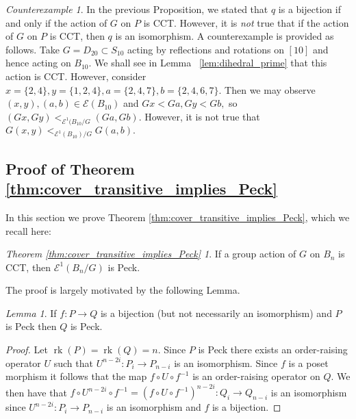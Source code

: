 \documentclass[10 pt]{amsart}
\theoremstyle{plain}
\theoremstyle{definition}
\theoremstyle{remark}
\numberwithin{equation}{section}
\newtheorem{lem}[thm]{Lemma}
\theoremstyle{remark}
\newtheorem{counterexample}[thm]{Counterexample}
\newcommand\ssec{\subsection}
\newcommand\rk{\operatorname{rk}}
\begin{document}
\begin{counterexample}
In the previous Proposition, we stated that $q$ is a bijection if and only if the action of $G$ on $P$ is CCT. However, it is {\it not} true that if the action of $G$ on $P$ is CCT, then $q$ is an isomorphism. A counterexample is provided as follows. Take $G=D_{20} \subset S_{10}$ acting by reflections and rotations on $[10]$ and hence acting on $B_{10}.$ We shall see in Lemma ~\ref{lem:dihedral_prime} that this action is CCT. However, consider $x = \{2,4\},y = \{1,2,4\},a = \{2,4,7\},b = \{2,4,6,7\}.$ Then we may observe $(x , y),(a, b) \in \mathcal E(B_{10})$ and $Gx < Ga, Gy < Gb,$ so $(Gx, Gy) <_{\mathcal E^1(B_{10}/G} (Ga, Gb).$ However, it is not true that $G(x, y)<_{\mathcal E^1(B_{10})/G} G(a,b).$
\end{counterexample}



\ssec{Proof of Theorem \ref{thm:cover_transitive_implies_Peck}}\label{ssec:proof_of_cover_transitive_implies_Peck}

In this section we prove Theorem \ref{thm:cover_transitive_implies_Peck}, which we recall here:

\newtheorem*{cover_transitive_implies_Peck}{Theorem \ref{thm:cover_transitive_implies_Peck}}
\begin{cover_transitive_implies_Peck}
If a group action of $G$ on $B_n$ is CCT, then $\mathcal E^1(B_n/G)$ is Peck.
\end{cover_transitive_implies_Peck}


The proof is largely motivated by the following Lemma.

\begin{lem}\label{lem:bijection_peck_implication}
If $f:P\rightarrow Q$ is a bijection (but not necessarily an isomorphism) and $P$ is Peck then $Q$ is Peck.
\end{lem}
\begin{proof}
Let $\rk(P) = \rk(Q) = n$.  Since $P$ is Peck there exists an order-raising operator $U$ such that $U^{n-2i}\colon P_i\rightarrow P_{n-i}$ is an isomorphism.  Since $f$ is a poset morphism it follows that the map $f\circ U\circ f^{-1}$ is an order-raising operator on $Q$.  We then have that $f\circ U^{n-2i}\circ f^{-1} = \left(f\circ U\circ f^{-1}\right)^{n-2i}\colon Q_i\rightarrow Q_{n-i}$ is an isomorphism since $U^{n-2i}\colon P_i\rightarrow P_{n-i}$ is an isomorphism and $f$ is a bijection.

\end{proof}
\end{document}
